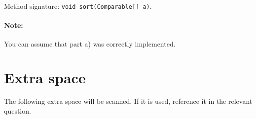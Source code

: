 \documentclass[addpoints]{exam}
\begin{document}
\begin{questions}
\begin{parts}
        Method signature: \texttt{void sort(Comparable[] a)}.
        

        \paragraph{Note:} You can assume that part a) was correctly implemented.

	\end{parts}


\end{questions}

\newpage

\section{Extra space}

The following extra space will be scanned. If it is used, reference it in the relevant question.


\newpage


\newpage
\end{document}
